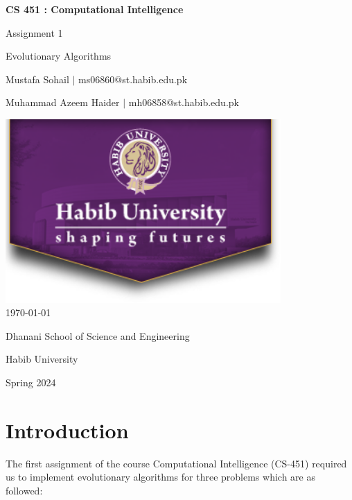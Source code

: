 \documentclass[12pt]{article}
\begin{document}
\begin{titlepage}
    \centering
    {\LARGE\textbf{CS 451 : Computational Intelligence}\par}
    \vspace{0.5cm}
    {\Large Assignment 1\par}
    \vspace{0.2cm}
    {\Large Evolutionary Algorithms\par}
    \vspace*{\fill} %
    {\large Mustafa Sohail $\mid$ ms06860@st.habib.edu.pk\par}
    {\large Muhammad Azeem Haider $\mid$ mh06858@st.habib.edu.pk\par}
    \vspace{2cm}
    \includegraphics[height=7cm]{images/HU_logo}\\\bigskip
    {\large \today}\\\bigskip\bigskip
    \vspace{1cm}
    \vspace{2cm}
    {\large Dhanani School of Science and Engineering\par}
    {\large Habib University\par}
    {\large Spring 2024\par}
    \vspace*{\fill} %
\end{titlepage}

\thispagestyle{empty} %
\tableofcontents
\clearpage

\section{Introduction}
The first assignment of the course Computational Intelligence (CS-451) required us to implement evolutionary algorithms for three problems which are as followed:
\end{document}
